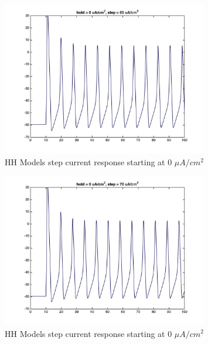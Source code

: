 \documentclass{beamer}
\begin{document}
\begin{frame}
  \begin{figure}
    \centering
    \includegraphics[width = 0.8\textwidth]{./images/current_0_65.jpg}
    \caption{HH Models step current response starting at 0 $\mu A/cm^2$}
  \end{figure}
\end{frame}


\begin{frame}
  \begin{figure}
    \centering
    \includegraphics[width = 0.8\textwidth]{./images/current_0_70.jpg}
    \caption{HH Models step current response starting at 0 $\mu A/cm^2$}
  \end{figure}
\end{frame}
\end{document}

